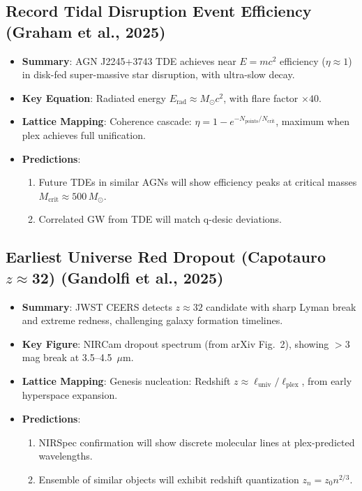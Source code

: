 \documentclass[11pt,a4paper]{article}
\begin{document}
\subsection{Record Tidal Disruption Event Efficiency (Graham et al., 2025)}

\begin{itemize}
\item \textbf{Summary}: AGN J2245+3743 TDE achieves near $E=mc^2$ efficiency ($\eta \approx 1$) in disk-fed super-massive star disruption, with ultra-slow decay.

\item \textbf{Key Equation}: Radiated energy $E_{\mathrm{rad}} \approx M_\odot c^2$, with flare factor $\times 40$.

\item \textbf{Lattice Mapping}: Coherence cascade: $\eta = 1 - e^{-N_{\mathrm{points}}/N_{\mathrm{crit}}}$, maximum when plex achieves full unification.

\item \textbf{Predictions}:
\begin{enumerate}
\item Future TDEs in similar AGNs will show efficiency peaks at critical masses $M_{\mathrm{crit}} \approx 500\,M_\odot$.
\item Correlated GW from TDE will match q-desic deviations.
\end{enumerate}
\end{itemize}

\subsection{Earliest Universe Red Dropout (Capotauro $z\approx$32) (Gandolfi et al., 2025)}

\begin{itemize}
\item \textbf{Summary}: JWST CEERS detects $z\approx 32$ candidate with sharp Lyman break and extreme redness, challenging galaxy formation timelines.

\item \textbf{Key Figure}: NIRCam dropout spectrum (from arXiv Fig.\ 2), showing $>3$ mag break at 3.5--4.5~$\mu$m.

\item \textbf{Lattice Mapping}: Genesis nucleation: Redshift $z \approx \ell_{\mathrm{univ}}/\ell_{\mathrm{plex}}$, from early hyperspace expansion.

\item \textbf{Predictions}:
\begin{enumerate}
\item NIRSpec confirmation will show discrete molecular lines at plex-predicted wavelengths.
\item Ensemble of similar objects will exhibit redshift quantization $z_n = z_0 n^{2/3}$.
\end{enumerate}
\end{itemize}
\end{document}
